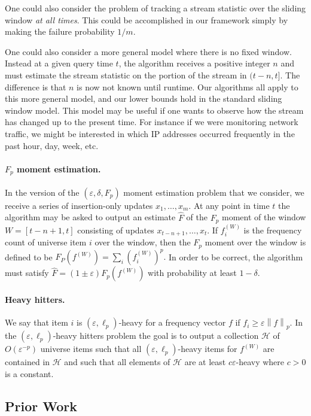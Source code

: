 \documentclass{article}
\newcommand{\eps}{\varepsilon}
\theoremstyle{plain}
\newcommand{\norm}[2]{\left\|#1 \right\|_{#2}}
\begin{document}
One could also consider the problem of tracking a stream statistic over the sliding window \textit{at all times}.  This could be accomplished in our framework simply by making the failure probability $1/m$.

One could also consider a more general model where there is no fixed window. Instead at a given query time $t$, the algorithm receives a positive integer $n$ and must estimate the stream statistic on the portion of the stream in $(t-n,t].$  The difference is that $n$ is now not known until runtime.  Our algorithms all apply to this more general model, and our lower bounds hold in the standard sliding window model.  This model may be useful if one wants to observe how the stream has changed up to the present time.  For instance if we were monitoring network traffic, we might be interested in which IP addresses occurred frequently in the past hour, day, week, etc.

\paragraph{$F_p$ moment estimation.}  In the version of the $(\eps, \delta, F_p)$ moment estimation problem that we consider, we receive a series of insertion-only updates $x_1, \ldots, x_m.$  At any point in time $t$ the algorithm may be asked to output an estimate $\hat{F}$ of the $F_p$ moment of the window $W = [t-n+1, t]$ consisting of updates $x_{t-n+1}, \ldots, x_t.$  If $f^{(W)}_i$ is the frequency count of universe item $i$ over the window, then the $F_p$ moment over the window is defined to be $F_P(f^{(W)})=\sum_i (f^{(W)}_i)^p.$  In order to be correct, the algorithm must satisfy $\hat{F} = (1\pm \eps) F_p(f^{(W)})$ with probability at least $1 - \delta.$

\paragraph{Heavy hitters.}  
We say that item $i$ is $(\eps, \ell_p)$-heavy for a frequency vector $f$ if $f_i \geq \eps \norm{f}{p}.$ In the $(\eps, \ell_p)$-heavy hitters problem the goal is to output a collection $\mathcal{H}$ of $O(\eps^{-p})$ universe items such that all $(\eps, \ell_p)$-heavy items for $f^{(W)}$ are contained in $\mathcal{H}$ and such that all elements of $\mathcal{H}$ are at least $c\eps$-heavy where $c > 0$ is a constant.

\subsection{Prior Work}
\end{document}
